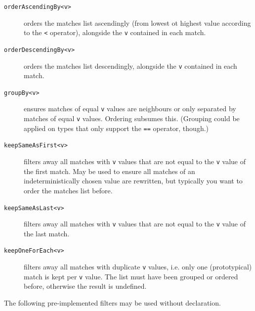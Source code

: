 \begin{description}
\item[\texttt{orderAscendingBy<v>}] orders the matches list ascendingly (from lowest ot highest value according to the \verb#<# operator), alongside the \texttt{v} contained in each match.
\item[\texttt{orderDescendingBy<v>}] orders the matches list descendingly, alongside the \texttt{v} contained in each match.
\item[\texttt{groupBy<v>}] ensures matches of equal \texttt{v} values are neighbours or only separated by matches of equal \texttt{v} values. Ordering subsumes this. (Grouping could be applied on types that only support the \verb#==# operator, though.)
\item[\texttt{keepSameAsFirst<v>}] filters away all matches with \texttt{v} values that are not equal to the \texttt{v} value of the first match. May be used to ensure all matches of an indeterministically chosen value are rewritten, but typically you want to order the matches list before.
\item[\texttt{keepSameAsLast<v>}] filters away all matches with \texttt{v} values that are not equal to the \texttt{v} value of the last match.
\item[\texttt{keepOneForEach<v>}] filters away all matches with duplicate \texttt{v} values, i.e. only one (prototypical) match is kept per \texttt{v} value. The list must have been grouped or ordered before, otherwise the result is undefined.
\end{description}
 
The following pre-implemented filters may be used without declaration.

